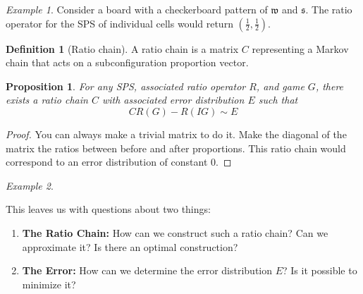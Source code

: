 \documentclass[12pt]{article}
\newtheorem{proposition}{Proposition}%
\theoremstyle{definition}
\newtheorem{definition}{Definition}%
\theoremstyle{remark}
\theoremstyle{remark}
\newtheorem{example}{Example}%
\begin{document}
\begin{example}
Consider a board with a checkerboard pattern of $\mathfrak{w}$ and $\mathfrak{s}$. The ratio operator for the SPS of individual cells would return $\left(\frac{1}{2},\frac{1}{2}\right)$.
\end{example} %

\begin{definition}[Ratio chain]
A ratio chain is a matrix $C$ representing a Markov chain that acts on a subconfiguration proportion vector.
\end{definition}

\begin{proposition}
For any SPS, associated ratio operator $R$, and game $G$, there exists a ratio chain $C$ with associated error distribution $E$ such that
\begin{equation}
	CR\left(G\right)-R\left(IG\right) \sim E
\end{equation}

\end{proposition}
\begin{proof}
You can always make a trivial matrix to do it. Make the diagonal of the matrix the ratios between before and after proportions. This ratio chain would correspond to an error distribution of constant 0.	
\end{proof}
\begin{example}

\end{example}
This leaves us with questions about two things:
\begin{enumerate}
	\item{\textbf{The Ratio Chain:} How can we construct such a ratio chain? Can we approximate it? Is there an optimal construction?}
	\item{\textbf{The Error:} How can we determine the error distribution $E$? Is it possible to minimize it?}
\end{enumerate}
\end{document}
